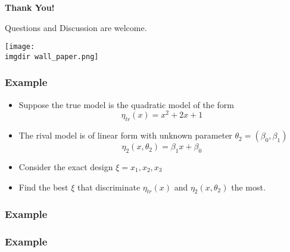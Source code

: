 \documentclass[xcolor=dvipsnames,aspectratio=1610]{beamer}
\begin{document}
\begin{frame}[plain]
\centering
\vfill
{\Huge \textbf{Thank You!} \par}
{\large Questions and Discussion are welcome. \par}
\texttt{[image: \\imgdir wall\_paper.png]}
\vfill
\end{frame}








\appendix

\begin{frame}
\frametitle{Example}

\begin{itemize}
\item Suppose the true model is the quadratic model of the form
$$\eta_{tr}(x)=x^2+2x+1$$
\item The rival model is of linear form with unknown parameter $\theta_2=(\beta_0,\beta_1)$
$$\eta_2(x,\theta_2)=\beta_1x+\beta_0$$
\item Consider the exact design $\xi={x_1,x_2,x_3}$
\item Find the best $\xi$ that discriminate $\eta_{tr}(x)$ and $\eta_2(x,\theta_2)$  the most.
\end{itemize}

\end{frame}


\begin{frame}
\frametitle{Example}

\begin{figure}
\end{figure}

\end{frame}



\begin{frame}
\frametitle{Example}

\begin{figure}
\end{figure}

\end{frame}
\end{document}
